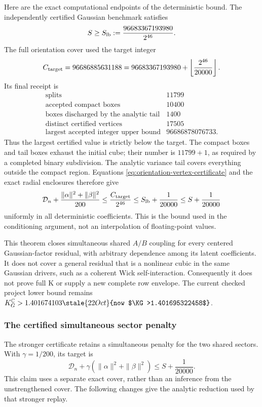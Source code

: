 Here are the exact computational endpoints of the deterministic bound.
The independently certified Gaussian benchmark satisfies
\[
 S\ge S_{\rm lb}:=\frac{96683367193980}{2^{46}}.
\]
The full orientation cover used the target integer
\[
 C_{\rm target}=96686885631188
 =96683367193980+\left\lfloor\frac{2^{46}}{20000}\right\rfloor.
\]
Its final receipt is
\[
 \begin{array}{lr}
 \text{splits}&11799\\
 \text{accepted compact boxes}&10400\\
 \text{boxes discharged by the analytic tail}&1400\\
 \text{distinct certified vertices}&17505\\
 \text{largest accepted integer upper bound}&96686878076733.
 \end{array}
\]
Thus the largest certified value is strictly below the target.  The
compact boxes and tail boxes exhaust the initial cube; their number is
$11799+1$, as required by a completed binary subdivision.  The analytic
variance tail covers everything outside the compact region.  Equations
\eqref{eq:orientation-vertex-certificate} and the exact radial enclosures
therefore give
\[
 \mathcal D_n+\frac{\|\alpha\|^2+\|\beta\|^2}{200}
 \le \frac{C_{\rm target}}{2^{46}}
 \le S_{\rm lb}+\frac1{20000}\le S+\frac1{20000}
\]
uniformly in all deterministic coefficients.  This is the bound used in
the conditioning argument, not an interpolation of floating-point values.

This theorem closes simultaneous shared $A/B$ coupling for every centered
Gaussian-factor residual, with arbitrary dependence among its latent
coefficients.  It does not cover a general residual that is a nonlinear
cubic in the same Gaussian drivers, such as a coherent Wick self-interaction.
Consequently it does not prove full K or supply a new complete row
envelope.  The current checked project lower bound remains
$K_G^{\mathbb C}>1.401674103\stale{22 Oct}{now $\KG>1.401695322458$}$.

\subsubsection{The certified simultaneous sector penalty}
\label{sec:certified-sector-penalty}

The stronger certificate retains a simultaneous penalty for the two
shared sectors.  With $\gamma=1/200$, its target is
\begin{equation}
 \mathcal D_n+\gamma(\|\alpha\|^2+\|\beta\|^2)
 \le S+\frac1{20000}.
 \label{eq:bonus-target}
\end{equation}
This claim uses a separate exact cover, rather than an inference from
the unstrengthened cover.  The following changes give the analytic
reduction used by that stronger replay.

